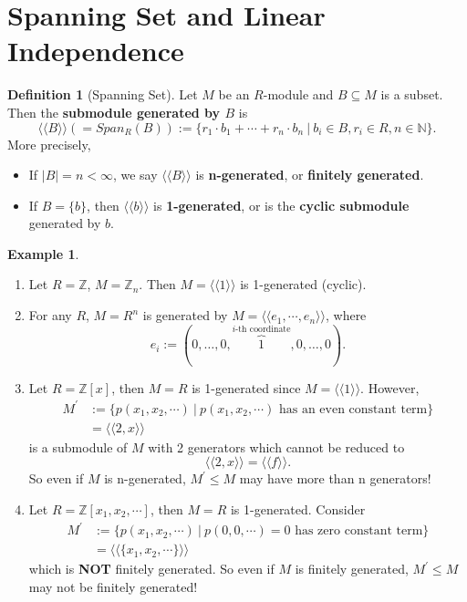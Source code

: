 \documentclass[11pt,openany]{book}
\theoremstyle{plain}
\theoremstyle{definition}
\newtheorem{definition}[definition]{Definition}
\newtheorem{example}[example]{Example}
\theoremstyle{remark}
\begin{document}
\section{Spanning Set and Linear Independence}
\begin{definition}[Spanning Set]
    Let $M$ be an $R$-module and $B \subseteq M$ is a subset. Then the {\bf submodule generated by $B$} is 
    $$\langle \langle B \rangle \rangle (=Span_{R}(B)):=\{ r_1 \cdot b_1+\cdots+r_n \cdot b_n \ |\ b_i \in B, r_i \in R, n \in \mathbb{N} \}.$$
    More precisely,
    \begin{itemize}
        \item If $\left| B\right|=n<\infty$, we say $\langle\langle B\rangle\rangle$ is {\bf n-generated}, or {\bf finitely generated}.
        \item If $B=\{b\}$, then $\langle\langle b\rangle\rangle$ is {\bf 1-generated}, or is the {\bf cyclic submodule} generated by $b$.
    \end{itemize}
\end{definition}

\begin{example}\label{eg-zxnotpid}
    \begin{enumerate}
        \item Let $R=\mathbb{Z}$, $M=\mathbb{Z}_{n}$. Then $M=\langle\langle 1\rangle\rangle$ is 1-generated (cyclic).
        \item For any $R$, $M=R^{n}$ is generated by $M=\langle\langle e_1,\cdots ,e_n\rangle\rangle$, where 
        $$e_i := (0,\dots,0,\overbrace{1}^{i\text{-th coordinate}},0,\dots,0).$$
        \item Let $R=\mathbb{Z}[x]$, then $M=R$ is 1-generated since $M=\langle\langle 1\rangle\rangle$. However, 
        \begin{align*}
            M^{'}&:=\{p(x_1,x_2,\cdots)\ |\ p(x_1,x_2,\cdots) \text{ has an even constant term}\}\\
            &=\langle\langle 2,x\rangle\rangle
        \end{align*}
        is a submodule of $M$ with 2 generators which cannot be reduced to $$\langle\langle2,x\rangle\rangle=\langle\langle f\rangle\rangle.$$
        So even if $M$ is n-generated, $M^{'}\leq M$ may have more than n generators!
        \item Let $R=\mathbb{Z}[x_1,x_2,\cdots]$, then $M=R$ is 1-generated.
        Consider
        \begin{align*}
            M^{'}&:=\{p(x_1,x_2,\cdots)\ |\ p(0,0,\cdots)=0 \text{ has zero constant term}\}\\
            &=\langle\langle \{x_1,x_2,\cdots\}\rangle\rangle
        \end{align*}
        which is {\bf NOT} finitely generated. So even if $M$ is finitely generated, $M^{'}\leq M$ may not be finitely generated!
    \end{enumerate}
\end{example}
\end{document}
